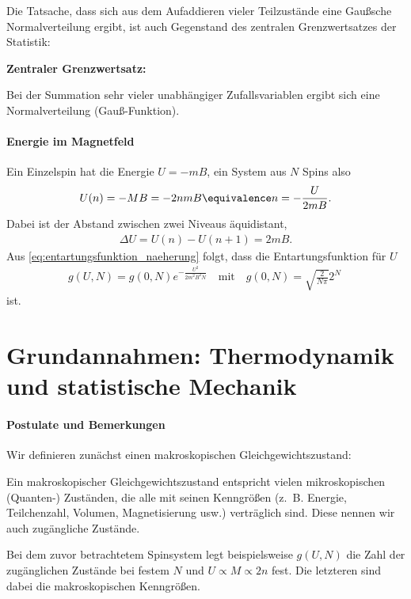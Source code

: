 Die Tatsache, dass sich aus dem Aufaddieren vieler Teilzustände eine Gaußsche Normalverteilung ergibt, ist auch Gegenstand des zentralen Grenzwertsatzes der Statistik:
\begin{formal}
    \textbf{Zentraler Grenzwertsatz:}

    Bei der Summation sehr vieler unabhängiger Zufallsvariablen ergibt sich eine Normalverteilung (Gauß-Funktion).
\end{formal}


\paragraph*{Energie im Magnetfeld}

Ein Einzelspin hat die Energie $U=-mB$, ein System aus $N$ Spins also
\begin{align*}
    U(n)=-MB = -2nmB \equivalence n = -\frac{U}{2mB}. 
\end{align*}
Dabei ist der Abstand zwischen zwei Niveaus äquidistant,
\begin{align*}
    \Delta U = U(n) - U(n+1) = 2mB.
\end{align*}
Aus \eqref{eq:entartungsfunktion_naeherung} folgt, dass die Entartungsfunktion für $U$
\begin{align*}
    \boxed{g(U,N) = g(0,N) e^{-\frac{U^2}{2m^2B^2N}} \quad \mathrm{mit}\quad g(0,N) = \sqrt{\frac{2}{N\pi }} 2^N}\:
\end{align*}
ist.


\section{Grundannahmen: Thermodynamik und statistische Mechanik}

\paragraph*{Postulate und Bemerkungen}

Wir definieren zunächst einen makroskopischen Gleichgewichtszustand:
\begin{formal}
    Ein makroskopischer Gleichgewichtszustand entspricht vielen mikroskopischen (Quanten-) Zuständen, die alle mit seinen Kenngrößen (z.~B. Energie, Teilchenzahl, Volumen, Magnetisierung usw.) verträglich sind. Diese nennen wir auch zugängliche Zustände.
\end{formal}

Bei dem zuvor betrachtetem Spinsystem legt beispielsweise $g(U,N)$ die Zahl der zugänglichen Zustände bei festem $N$ und $U\propto M \propto 2n$ fest. Die letzteren sind dabei die makroskopischen Kenngrößen.

